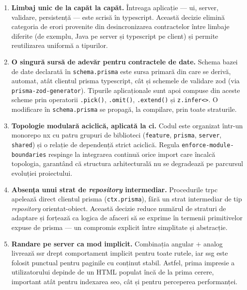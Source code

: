 \begin{enumerate}
  \item \textbf{Limbaj unic de la capăt la capăt.} Întreaga aplicație --- \acrshort{ui}, server, validare, persistență --- este scrisă în \gls{typescript}. Această decizie elimină categoria de erori provenite din desincronizarea contractelor între limbaje diferite (de exemplu, Java pe server și \gls{typescript} pe client) și permite reutilizarea uniformă a tipurilor.

  \item \textbf{O singură sursă de adevăr pentru contractele de date.} Schema bazei de date declarată în \texttt{schema.prisma} este sursa primară din care se derivă, automat, atât clientul \gls{prisma} \gls{typescript}, cât și schemele de validare \gls{zod} (via \texttt{prisma-zod-generator}). Tipurile aplicaționale sunt apoi compuse din aceste scheme prin operatorii \texttt{.pick()}, \texttt{.omit()}, \texttt{.extend()} și \texttt{z.infer<>}. O modificare în \texttt{schema.prisma} se propagă, la compilare, prin toate straturile.

  \item \textbf{Topologie modulară aciclică, aplicată la \acrshort{ci}.} Codul este organizat într-un \gls{monorepo} \gls{nx} cu patru grupuri de biblioteci (\texttt{feature}, \texttt{prisma}, \texttt{server}, \texttt{shared}) și o relație de dependență strict aciclică. Regula \texttt{enforce-module-boundaries} respinge la integrarea continuă orice import care încalcă topologia, garantând că structura arhitecturală nu se degradează pe parcursul evoluției proiectului.

  \item \textbf{Absența unui strat de \textit{repository} intermediar.} Procedurile \gls{trpc} apelează direct clientul \gls{prisma} (\texttt{ctx.prisma}), fără un strat intermediar de tip \textit{repository} orientat-obiect. Această decizie reduce numărul de straturi de adaptare și forțează ca logica de afaceri să se exprime în termenii primitivelor expuse de \gls{prisma} --- un compromis explicit între simplitate și abstracție.

  \item \textbf{Randare pe server ca mod implicit.} Combinația \gls{angular} \(+\) \gls{analog} livrează \acrshort{ssr} drept comportament implicit pentru toate rutele, iar \acrshort{ssg} este folosit punctual pentru paginile cu conținut stabil. Astfel, prima impresie a utilizatorului depinde de un HTML populat încă de la prima cerere, important atât pentru indexarea \acrshort{seo}, cât și pentru perceperea performanței.
\end{enumerate}

